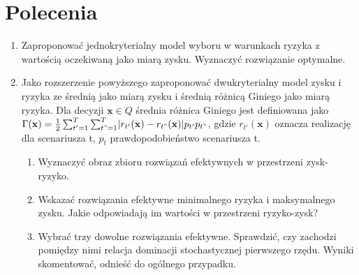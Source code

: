 \section*{Polecenia}
\begin{enumerate}
  \item Zaproponować jednokryterialny model wyboru w warunkach ryzyka z wartością oczekiwaną jako 
  miarą zysku. Wyznaczyć rozwiązanie optymalne.
  \item Jako rozszerzenie powyższego zaproponować dwukryterialny model zysku i ryzyka ze średnią 
  jako miarą zysku i średnią różnicą Giniego jako miarą ryzyka. Dla decyzji 
  $\mathbf{x}\in Q$ średnia różnica Giniego jest definiowana jako 
  $\Gamma(\mathbf{x})=\frac{1}{2}\sum_{t'=1}^{T}\sum_{t"=1}^{T}\lvert r_{t'}(\mathbf{x})-r_{t"}(\mathbf{x})\rvert p_{t'}p_{t"}$, gdzie $r_{t'}(\mathbf{x})$ 
  oznacza realizację dla scenariusza t, $p_{t}$ prawdopodobieństwo scenariusza t.
  \begin{enumerate}
    \item Wyznaczyć obraz zbioru rozwiązań efektywnych w przestrzeni zysk-ryzyko.
    \item Wskazać rozwiązania efektywne minimalnego ryzyka i maksymalnego zysku. Jakie odpowiadają im 
    wartości w przestrzeni ryzyko-zysk?
    \item Wybrać trzy dowolne rozwiązania efektywne. Sprawdzić, czy zachodzi pomiędzy nimi relacja 
    dominacji stochastycznej pierwszego rzędu. Wyniki skomentować, odnieść do ogólnego przypadku.
  \end{enumerate}
\end{enumerate}

